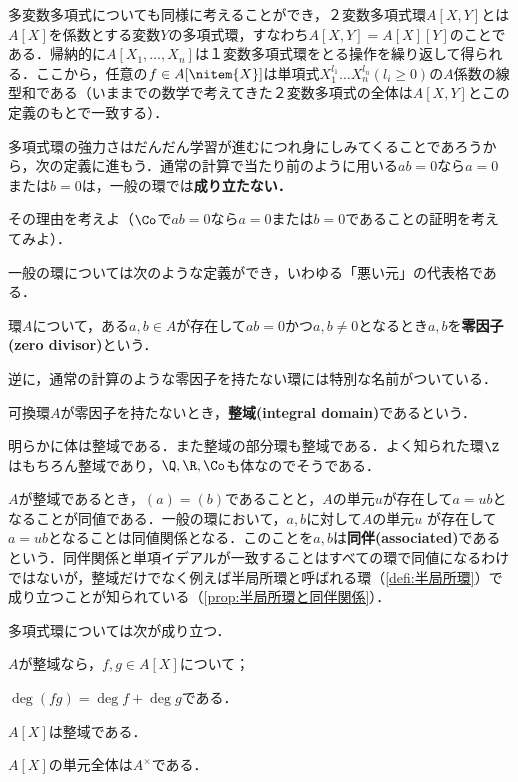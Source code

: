 多変数多項式についても同様に考えることができ，２変数多項式環$A[X,Y]$とは$A[X]$を係数とする変数$Y$の多項式環，すなわち$A[X,Y]=A[X][Y]$のことである．帰納的に$A[X_1,\dots,X_n]$は１変数多項式環をとる操作を繰り返して得られる．ここから，任意の$f\in A[\nitem{X}]$は単項式$X_1^{l_1}\dots X_n^{l_n} (l_i\geq0)$の$A$係数の線型和である（いままでの数学で考えてきた２変数多項式の全体は$A[X,Y]$とこの定義のもとで一致する）．

多項式環の強力さはだんだん学習が進むにつれ身にしみてくることであろうから，次の定義に進もう．通常の計算で当たり前のように用いる$ab=0$なら$a=0$または$b=0$は，一般の環では\textbf{成り立たない．}

\begin{exer}
	その理由を考えよ（$\Co$で$ab=0$なら$a=0$または$b=0$であることの証明を考えてみよ）．
\end{exer}

一般の環については次のような定義ができ，いわゆる「悪い元」の代表格である．

\begin{defi}[零因子]
	環$A$について，ある$a,b\in A$が存在して$ab=0$かつ$a,b\neq0$となるとき$a,b$を\textbf{零因子(zero divisor)}という．
\end{defi}

逆に，通常の計算のような零因子を持たない環には特別な名前がついている．

\begin{defi}[整域]
	可換環$A$が零因子を持たないとき，\textbf{整域(integral domain)}であるという．
\end{defi}

明らかに体は整域である．また整域の部分環も整域である．よく知られた環$\Z$はもちろん整域であり，$\Q, \R, \Co$も体なのでそうである．

$A$が整域であるとき，$(a)=(b)$であることと，$A$の単元$u$が存在して$a=ub$となることが同値である．一般の環において，$a,b$に対して$A$の単元$u$
が存在して$a=ub$となることは同値関係となる．このことを$a,b$は\textbf{同伴(associated)}であるという．同伴関係と単項イデアルが一致することはすべての環で同値になるわけではないが，整域だけでなく例えば半局所環と呼ばれる環（\ref{defi:半局所環}）で成り立つことが知られている（\ref{prop:半局所環と同伴関係}）．

多項式環については次が成り立つ．

\begin{prop}
	$A$が整域なら，$f,g\in A[X]$について；
	\begin{sakura}
		\item $\deg(fg)=\deg f+\deg g$である．
		\item $A[X]$は整域である．
		\item $A[X]$の単元全体は$A^\times$である．
	\end{sakura}
\end{prop}

